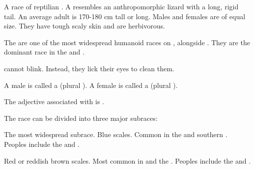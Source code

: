 \begin{gloss}







\begin{comment}
\paragraph{\scatha}
\end{comment}
\gitem[\scathae]{\scatha}
A race of reptilian . 
A \scatha{} resembles an anthropomorphic lizard with a long, rigid tail. 
An average adult is 170-180 cm tall or long. 
Males and females are of equal size. 
They have tough scaly skin and are herbivorous. 

The \scathae{} are one of the most widespread humanoid races on \Miith{}, alongside . 
They are the dominant race in the  and . 

\Scathae{} cannot blink. 
Instead, they lick their eyes to clean them. 

\index{\dax}
\index{\sphyle}
A male \scatha{} is called a \dax{} (plural \daxes). 
A female is called a \sphyle{} (plural \sphyles). 

The adjective associated with \quo{\scatha} is \quo{\scathaese}. 

The \scathaese{} race can be divided into three major subraces: 

\begin{subgloss}
  \begin{comment}
  \subparagraph{\Tassian}
  \end{comment}
  \gitem[\Tassians]{\Tassian}
    The most widespread subrace. 
    Blue scales. 
    Common in the  and southern . 
    Peoples include the  and . 
    
  \begin{comment}
  \subparagraph{\Mekrii}
  \end{comment}
  \gitem[\Mekriis]{\Mekrii}
    Red or reddish brown scales.
    Most common in  and the . 
    Peoples include the  and . 
    

\end{subgloss}
\end{gloss}
